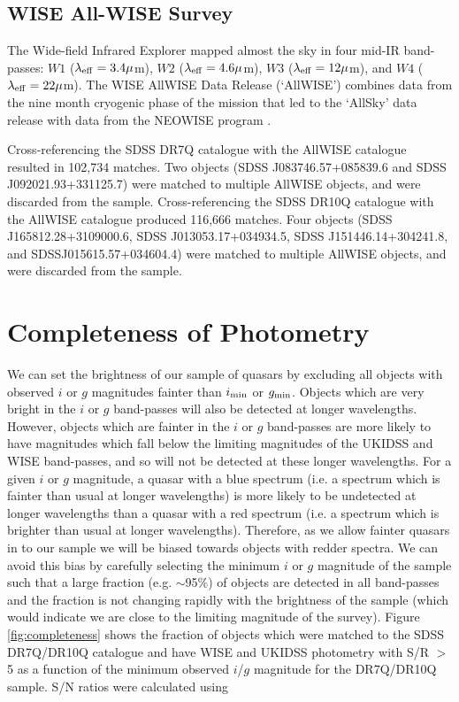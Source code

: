 \subsection{WISE All-WISE Survey}

The Wide-field Infrared Explorer \citep[WISE;][]{wright10} mapped almost the sky in four mid-IR band-passes: $W1$ ($\lambda_{\rm eff} = 3.4\mu$m), $W2$ ($\lambda_{\rm eff} = 4.6\mu$m), $W3$ ($\lambda_{\rm eff} = 12\mu$m), and $W4$ ($\lambda_{\rm eff} = 22\mu$m). The WISE AllWISE Data Release (`AllWISE') combines data from the nine month cryogenic phase of the mission that led to the `AllSky' data release with data from the NEOWISE program \citep{mainzer11}. 

Cross-referencing the SDSS DR7Q catalogue with the AllWISE catalogue resulted in 102,734 matches. Two objects (SDSS J083746.57+085839.6 and SDSS J092021.93+331125.7) were matched to multiple AllWISE objects, and were discarded from the sample. Cross-referencing the SDSS DR10Q catalogue with the AllWISE catalogue produced 116,666 matches. Four objects (SDSS J165812.28+3109000.6, SDSS J013053.17+034934.5, SDSS J151446.14+304241.8, and SDSSJ015615.57+034604.4) were matched to multiple AllWISE objects, and were discarded from the sample. 

\section{Completeness of Photometry}

We can set the brightness of our sample of quasars by excluding all objects with observed $i$ or $g$ magnitudes fainter than $i_{\rm min}$ or $g_{\rm min}$. Objects which are very bright in the $i$ or $g$ band-passes will also be detected at longer wavelengths. However, objects which are fainter in the $i$ or $g$ band-passes are more likely to have magnitudes which fall below the limiting magnitudes of the UKIDSS and WISE band-passes, and so will not be detected at these longer wavelengths. For a given $i$ or $g$ magnitude, a quasar with a blue spectrum (i.e. a spectrum which is fainter than usual at longer wavelengths) is more likely to be undetected at longer wavelengths than a quasar with a red spectrum (i.e. a spectrum which is brighter than usual at longer wavelengths). Therefore, as we allow fainter quasars in to our sample we will be biased towards objects with redder spectra. We can avoid this bias by carefully selecting the minimum $i$ or $g$ magnitude of the sample such that a large fraction (e.g. $\sim$95\%) of objects are detected in all band-passes and the fraction is not changing rapidly with the brightness of the sample (which would indicate we are close to the limiting magnitude of the survey). Figure \ref{fig:completeness} shows the fraction of objects which were matched to the SDSS DR7Q/DR10Q catalogue and have WISE and UKIDSS photometry with S/R $>$ 5 as a function of the minimum observed $i$/$g$ magnitude for the DR7Q/DR10Q sample. S/N ratios were calculated using

